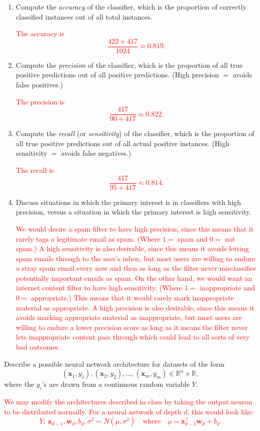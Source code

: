 \documentclass[12pt,reqno]{amsart}
\begin{document}
\medskip
\begin{enumerate}
\item Compute the \textit{accuracy} of the classifier, which is the proportion of correctly classified instances out of all total instances.

\bigskip
\textcolor{red}{The accuracy is
	\[\frac{422 + 417}{1024} \approx 0.819.
	\]}
\bigskip

\item Compute the \textit{precision} of the classifier, which is the proportion of all true positive predictions out of all positive predictions. (High precision $=$ avoids false positives.)

\bigskip
\textcolor{red}{The precision is
	\[\frac{417}{90 + 417} \approx 0.822.
	\]}
\bigskip

\item Compute the \textit{recall} (or \textit{sensitivity}) of the classifier, which is the proportion of all true positive predictions out of all actual positive instances. (High sensitivity $=$ avoids false negatives.)

\bigskip
\textcolor{red}{The recall is
	\[\frac{417}{95 + 417} \approx 0.814.
	\]}
\bigskip

\item Discuss situations in which the primary interest is in classifiers with high precision, versus a situation in which the primary interest is high sensitivity.

\bigskip
\textcolor{red}{We would desire a spam filter to have high precision, since this means that it rarely tags a legitimate email as spam. (Where $1=$ spam and $0=$ not spam.) A high sensitivity is also desirable, since this means it avoids letting spam emails through to the user's inbox, but most users are willing to endure a stray spam email every now and then as long as the filter never misclassifies potentially important emails as spam. On the other hand, we would want an internet content filter to have high sensitivity. (Where $1=$ inappropriate and $0=$ appropriate.) This means that it would rarely mark inappropriate material as appropriate. A high precision is also desirable, since this means it avoids marking appropriate material as inappropriate, but most users are willing to endure a lower precision score as long as it means the filter never lets inappropriate content pass through which could lead to all sorts of very bad outcomes.}
\bigskip
\end{enumerate}








\prob Describe a possible neural network architecture for datasets of the form
	\[(\mathbf{x}_1,y_1),(\mathbf{x}_2,y_2),\ldots,(\mathbf{x}_m,y_m) \in \mathbb{R}^n \times \mathbb{R},
	\]
where the $y_i$'s are drawn from a continuous random variable $Y$.

\bigskip
\textcolor{red}{We may modify the architectures described in class by taking the output neuron to be distributed normally. For a neural network of depth $d$, this would look like:
	\[Y ;\  \mathbf{z}_{d-1}, \mathbf{w}_d, b_d, \sigma^2 \sim N(\mu,\sigma^2) \quad \text{where} \quad \mu = \mathbf{z}_{d-1} ^\intercal \mathbf{w}_d + b_d.
	\]}
\end{document}
